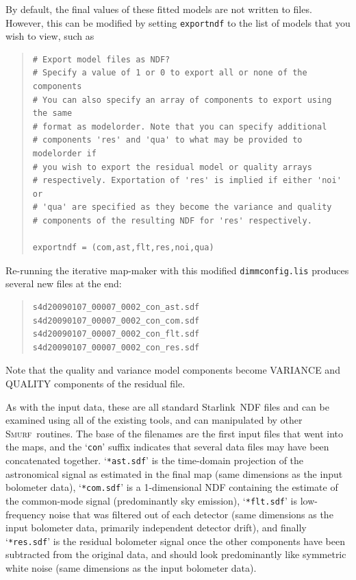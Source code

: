 \documentclass[twoside,11pt]{article}
\newenvironment{myquote}{\begin{quote}\begin{small}}{\end{small}\end{quote}}
\newcommand{\starlink}{\htmladdnormallink{Starlink}{http://star-www.rl.ac.uk/}}
\newcommand{\smurf}{\xref{\textsc{Smurf}}{sun258}{}}
\newcommand{\htmladdnormallink}[2]{#1}
\newcommand{\xref}[3]{#1}
\renewcommand{\_}{\texttt{\symbol{95}}}
\begin{document}
By default, the final values of these fitted models are not written to
files. However, this can be modified by setting \texttt{exportndf} to
the list of models that you wish to view, such as

\begin{myquote}
\begin{verbatim}
# Export model files as NDF?
# Specify a value of 1 or 0 to export all or none of the components
# You can also specify an array of components to export using the same
# format as modelorder. Note that you can specify additional
# components 'res' and 'qua' to what may be provided to modelorder if
# you wish to export the residual model or quality arrays
# respectively. Exportation of 'res' is implied if either 'noi' or
# 'qua' are specified as they become the variance and quality
# components of the resulting NDF for 'res' respectively.

exportndf = (com,ast,flt,res,noi,qua)
\end{verbatim}
\end{myquote}

Re-running the iterative map-maker with this modified
\texttt{dimmconfig.lis} produces several new files at the end:

\begin{myquote}
\begin{verbatim}
s4d20090107_00007_0002_con_ast.sdf
s4d20090107_00007_0002_con_com.sdf
s4d20090107_00007_0002_con_flt.sdf
s4d20090107_00007_0002_con_res.sdf
\end{verbatim}
\end{myquote}

Note that the quality and variance model components become VARIANCE
and QUALITY components of the residual file.

As with the input data, these are all standard \starlink\ NDF files
and can be examined using all of the existing tools, and can
manipulated by other \smurf\ routines. The base of the filenames are
the first input files that went into the maps, and the `\texttt{con}'
suffix indicates that several data files may have been concatenated
together. `\texttt{*ast.sdf}' is the time-domain projection of the
astronomical signal as estimated in the final map (same dimensions as
the input bolometer data), `\texttt{*com.sdf}' is a 1-dimensional NDF
containing the estimate of the common-mode signal (predominantly sky
emission), `\texttt{*flt.sdf}' is low-frequency noise that was
filtered out of each detector (same dimensions as the input bolometer
data, primarily independent detector drift), and finally
`\texttt{*res.sdf}' is the residual bolometer signal once the other
components have been subtracted from the original data, and should
look predominantly like symmetric white noise (same dimensions as the
input bolometer data).
\end{document}
